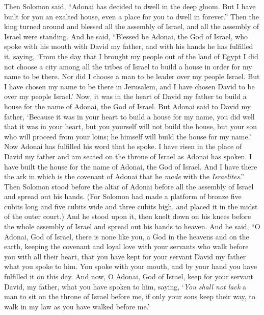 \begin{biblechapter} %
 Then Solomon said, “Adonai has decided to dwell in the deep gloom.
\verse But I have built for you an exalted house, even a place for you to dwell in forever.”
\verse Then the king turned around and blessed all the assembly of Israel, and all the assembly of Israel were standing.
\verse And he said, “Blessed be Adonai, the God of Israel, who spoke with his mouth with David my father, and with his hands he has fulfilled it, saying,
\verse ‘From the day that I brought my people out of the land of Egypt I did not choose a city among all the tribes of Israel to build a house in order for my name to be there. Nor did I choose a man to be leader over my people Israel.
\verse But I have chosen my name to be there in Jerusalem, and I have chosen David to be over my people Israel.’
\verse Now, it was in the heart of David my father to build a house for the name of Adonai, the God of Israel.
\verse But Adonai said to David my father, ‘Because it was in your heart to build a house for my name, you did well that it was in your heart,
\verse but you yourself will not build the house, but your son who will proceed from your loins; he himself will build the house for my name.’
\verse Now Adonai has fulfilled his word that he spoke. I have risen in the place of David my father and am seated on the throne of Israel as Adonai has spoken. I have built the house for the name of Adonai, the God of Israel.
\verse And I have there the ark in which is the covenant of Adonai that he \textit{made} with the \textit{Israelites}.”
 Then Solomon stood before the altar of Adonai before all the assembly of Israel and spread out his hands.
\verse (For Solomon had made a platform of bronze five cubits long and five cubits wide and three cubits high, and placed it in the midst of the outer court.) And he stood upon it, then knelt down on his knees before the whole assembly of Israel and spread out his hands to heaven.
\verse And he said, “O Adonai, God of Israel, there is none like you, a God in the heavens and on the earth, keeping the covenant and loyal love with your servants who walk before you with all their heart,
\verse that you have kept for your servant David my father what you spoke to him. You spoke with your mouth, and by your hand you have fulfilled it on this day.
\verse And now, O Adonai, God of Israel, keep for your servant David, my father, what you have spoken to him, saying, ‘\textit{You shall not lack} a man to sit on the throne of Israel before me, if only your sons keep their way, to walk in my law as you have walked before me.’

\end{biblechapter}
